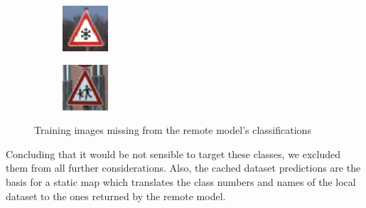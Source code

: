 \begin{figure}
\begin{subfigure}{.19\linewidth}
\end{subfigure}%
\begin{subfigure}{.19\linewidth}
\includegraphics[width=0.7\linewidth]{imgs/missing/00004_00016}
\end{subfigure}
\begin{subfigure}{.19\linewidth}
\includegraphics[width=0.7\linewidth]{imgs/missing/00014_00027}
\end{subfigure}
\caption{Training images missing from the remote model's classifications}
\label{fig:missing}
\end{figure}

Concluding that it would be not sensible to target these classes, we excluded them from all further considerations.
Also, the cached dataset predictions are the basis for a static map which translates the class numbers and names of the local dataset to the ones returned by the remote model.

